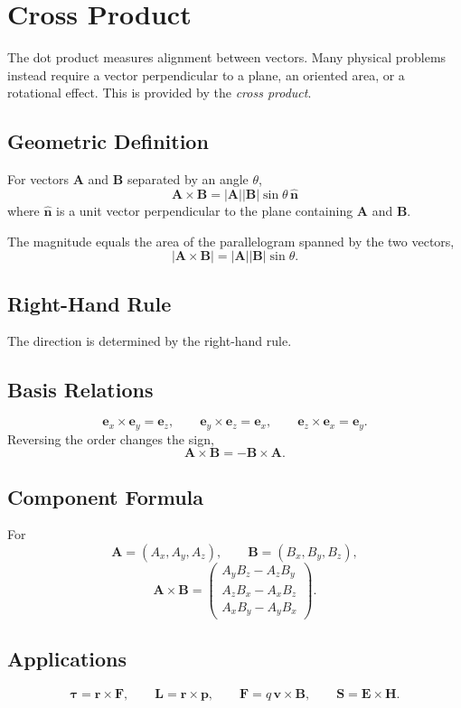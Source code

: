
\section{Cross Product}
The dot product measures alignment between vectors. Many physical problems instead require a vector perpendicular to a plane, an oriented area, or a rotational effect. This is provided by the \emph{cross product}.

\subsection{Geometric Definition}
For vectors $\mathbf A$ and $\mathbf B$ separated by an angle $\theta$,
\[
\boxed{\mathbf A\times\mathbf B=|\mathbf A||\mathbf B|\sin\theta\,\hat{\mathbf n}}
\]
where $\hat{\mathbf n}$ is a unit vector perpendicular to the plane containing $\mathbf A$ and $\mathbf B$.

The magnitude equals the area of the parallelogram spanned by the two vectors,
\[
|\mathbf A\times\mathbf B|=|\mathbf A||\mathbf B|\sin\theta.
\]

\subsection{Right-Hand Rule}
The direction is determined by the right-hand rule.

\subsection{Basis Relations}
\[
\mathbf e_x\times\mathbf e_y=\mathbf e_z,\qquad
\mathbf e_y\times\mathbf e_z=\mathbf e_x,\qquad
\mathbf e_z\times\mathbf e_x=\mathbf e_y.
\]
Reversing the order changes the sign,
\[
\mathbf A\times\mathbf B=-\mathbf B\times\mathbf A.
\]

\subsection{Component Formula}
For
\[
\mathbf A=(A_x,A_y,A_z),\qquad
\mathbf B=(B_x,B_y,B_z),
\]
\[
\mathbf A\times\mathbf B=
\begin{pmatrix}
A_yB_z-A_zB_y\\
A_zB_x-A_xB_z\\
A_xB_y-A_yB_x
\end{pmatrix}.
\]

\subsection{Applications}
\[
\boldsymbol\tau=\mathbf r\times\mathbf F,\qquad
\mathbf L=\mathbf r\times\mathbf p,\qquad
\mathbf F=q\,\mathbf v\times\mathbf B,\qquad
\mathbf S=\mathbf E\times\mathbf H.
\]

